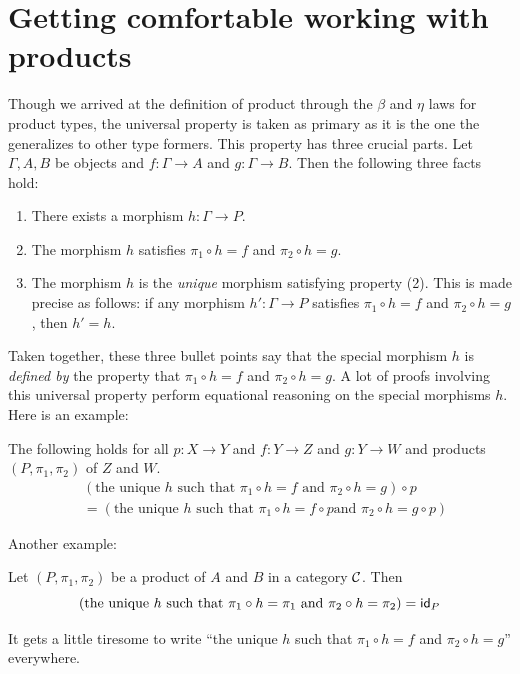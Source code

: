 \section{Getting comfortable working with products}

Though we arrived at the definition of product through the \(\beta\)
and \(\eta\) laws for product types,
the universal property is taken as primary
as it is the one the generalizes to other type formers.
This property has three crucial parts.
Let \(\Gamma,A,B\) be objects and \(f : \Gamma \to A\)
and \(g : \Gamma \to B\). Then the following three facts hold:
\begin{enumerate}
\item There exists a morphism \(h : \Gamma \to P\).
\item The morphism \(h\) satisfies \(\pi_1 \circ h = f\) and \(\pi_2 \circ h = g\).
\item The morphism \(h\) is the \emph{unique} morphism satisfying property (2).
  This is made precise as follows:
  if any morphism \(h' : \Gamma \to P\) satisfies \(\pi_1 \circ h = f\)
  and \(\pi_2 \circ h = g\), then \(h' = h\).
\end{enumerate}
Taken together, these three bullet points say that
the special morphism \(h\) is \emph{defined by}
the property that \(\pi_1 \circ h = f\) and \(\pi_2 \circ h = g\).
A lot of proofs involving this universal property
perform equational reasoning
on the special morphisms \(h\).
Here is an example:
\begin{proposition} \label{prop:tupling-nat}
  The following holds for all \(p : X \to Y\)
  and \(f : Y \to Z\) and \(g : Y \to W\)
  and products \((P,\pi_1,\pi_2)\) of \(Z\) and \(W\).
  \begin{align*}
  &(\text{the unique \(h\) such that \(\pi_1\circ h = f\) and \(\pi_2 \circ h = g\)})
  \circ p
  \\
  &= (\text{the unique \(h\) such that \(\pi_1 \circ h = f \circ p\)
  and \(\pi_2 \circ h = g \circ p\)})
  \end{align*}
\end{proposition}
Another example:
\begin{proposition}
  Let \((P,\pi_1,\pi_2)\) be a product of \(A\) and \(B\)
  in a category \(\mathcal C\).
  Then
  \[
  (\text{the unique \(h\) such that \(\pi_1\circ h = \pi_1\)
  and \(\pi_2 \circ h = \pi_2\)})
  = \mathsf{id}_{P}
  \]
\end{proposition}
It gets a little tiresome to write ``the unique \(h\) such that \(\pi_1 \circ h = f\)
and \(\pi_2 \circ h = g\)'' everywhere.
